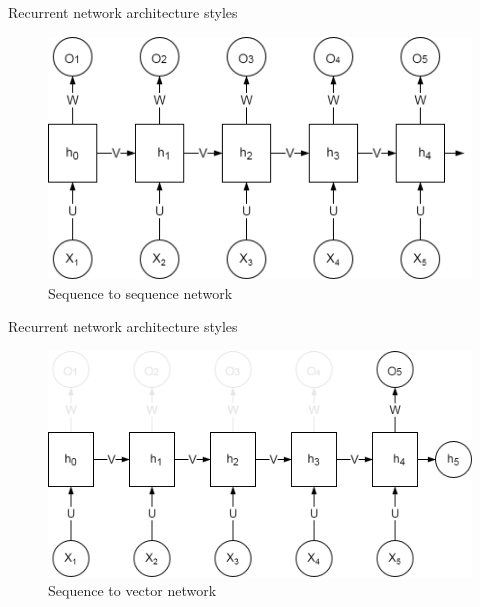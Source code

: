 \begin{frame}{Recurrent network architecture styles}
\begin{center}
	\begin{figure}
		\includegraphics[width=1\textwidth]{figures/rnn_seq_2_seq}
		\caption*{{Sequence to sequence network}}
	\end{figure}
\end{center}
\end{frame}
\begin{frame}{Recurrent network architecture styles}
\begin{center}
	\begin{figure}
		\includegraphics[width=1\textwidth]{figures/rnn_seq_2_vec}
		\caption*{{Sequence to vector network}}
	\end{figure}
\end{center}
\end{frame}
